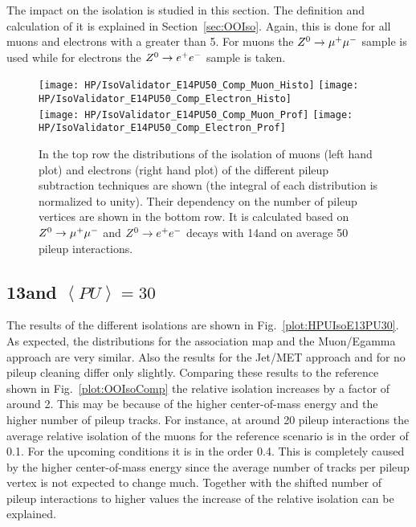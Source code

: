 The impact on the isolation is studied in this section. The definition and calculation of it is explained in Section~\ref{sec:OOIso}. Again, this is done for all muons and electrons with a \pt greater than 5\GeV. For muons the ${Z^{0}}\rightarrow\mu^+\mu^-$ sample is used while for electrons the ${Z^{0}}\rightarrow e^+e^-$ sample is taken.

\begin{figure}[Hb]
    \centering
    \texttt{[image: HP/IsoValidator\_E14PU50\_Comp\_Muon\_Histo]}
    \texttt{[image: HP/IsoValidator\_E14PU50\_Comp\_Electron\_Histo]}
    \\
    \texttt{[image: HP/IsoValidator\_E14PU50\_Comp\_Muon\_Prof]}
    \texttt{[image: HP/IsoValidator\_E14PU50\_Comp\_Electron\_Prof]}
    \caption[Distribution of the isolation of muons and electrons and their dependence on the number of pileup vertices for events with 14\TeV and $\left<PU\right>=50$]{In the top row the distributions of the isolation of muons (left hand plot) and electrons (right hand plot) of the different pileup subtraction techniques are shown (the integral of each distribution is normalized to unity). Their dependency on the number of pileup vertices are shown in the bottom row. It is calculated based on ${Z^{0}}\rightarrow\mu^+\mu^-$ and ${Z^{0}}\rightarrow e^+e^-$ decays with 14\TeV and on average 50 pileup interactions.\label{plot:HPUIsoE14PU50}}
\end{figure}

\subsection{13\TeV and $\left<PU\right>=30$ \label{sec:HPUIsoE13PU30}}

The results of the different isolations are shown in Fig.~\ref{plot:HPUIsoE13PU30}. As expected, the distributions for the association map and the Muon/Egamma approach are very similar. Also the results for the Jet/MET approach and for no pileup cleaning differ only slightly. Comparing these results to the reference shown in Fig.~\ref{plot:OOIsoComp}  the relative isolation increases by a factor of around 2. This may be because of the higher center-of-mass energy and the higher number of pileup tracks. For instance, at around 20 pileup interactions the average relative isolation of the muons for the reference scenario is in the order of 0.1. For the upcoming conditions it is in the order 0.4. This is completely caused by the higher center-of-mass energy since the average number of tracks per pileup vertex is not expected to change much. Together with the shifted number of pileup interactions to higher values the increase of the relative isolation can be explained.

